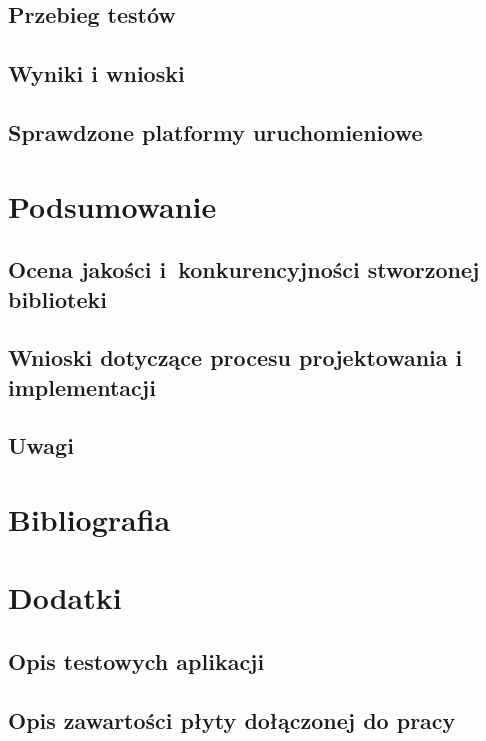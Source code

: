 \documentclass[11pt,oneside,a4paper,final]{llncs}
\begin{document}
\subsection{Przebieg testów}
\subsection{Wyniki i wnioski}
\subsection{Sprawdzone platformy uruchomieniowe\newline}

\section{Podsumowanie}
\subsection{Ocena jakości i~konkurencyjności stworzonej biblioteki}
\subsection{Wnioski dotyczące procesu projektowania i implementacji}
\subsection{Uwagi\newline}

\section{Bibliografia}

\section{Dodatki}
\subsection{Opis testowych aplikacji}
\subsection{Opis zawartości płyty dołączonej do pracy}
\end{document}
